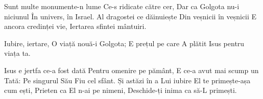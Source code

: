 \beginverse
Sunt multe monumente-n lume
Ce-s ridicate către cer,
Dar ca Golgota nu-i niciunul
În univers, în Israel.
Al dragostei ce dăinuiește
Din veșnicii în veșnicii
E ancora credinței vie,
Iertarea sfintei mântuiri.
\endverse

\beginchorus
Iubire, iertare,
O viață nouă-i Golgota;
E prețul pe care
A plătit Isus pentru viața ta.
\endchorus

\beginverse
Isus e jertfa ce-a fost dată
Pentru omenire pe pământ,
E ce-a avut mai scump un Tată:
Pe singurul Său Fiu cel sfânt.
Și astăzi în a Lui iubire
El te primește-așa cum ești,
Prieten ca El n-ai pe nimeni,
Deschide-ți inima ca să-L primești.
\endverse
\endsong